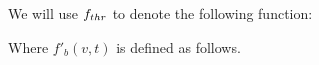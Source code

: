 We will use $f_{thr}$ to denote the following function:
\fthrleak

Where $f'_b(v, t)$ is defined as follows.


